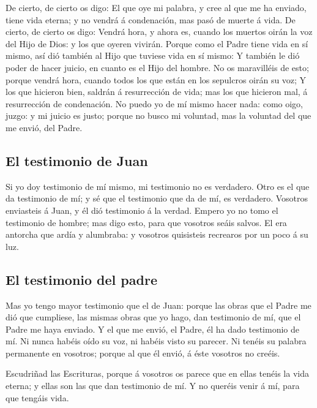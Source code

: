 De cierto, de cierto os digo: El que oye mi palabra, y
cree al que me ha enviado, tiene vida eterna; y no vendrá á condenación,
mas pasó de muerte á vida.  De cierto, de cierto os digo:
Vendrá hora, y ahora es, cuando los muertos oirán la voz del Hijo de
Dios: y los que oyeren vivirán.  Porque como el Padre
tiene vida en sí mismo, así dió también al Hijo que tuviese vida en sí
mismo:  Y también le dió poder de hacer juicio, en cuanto
es el Hijo del hombre.  No os maravilléis de esto; porque
vendrá hora, cuando todos los que están en los sepulcros oirán su voz;
 Y los que hicieron bien, saldrán á resurrección de vida;
mas los que hicieron mal, á resurrección de condenación. 
No puedo yo de mí mismo hacer nada: como oigo, juzgo: y mi juicio es
justo; porque no busco mi voluntad, mas la voluntad del que me envió,
del Padre.

\hypertarget{el-testimonio-de-juan}{%
\subsection{El testimonio de Juan}\label{el-testimonio-de-juan}}

 Si yo doy testimonio de mí mismo, mi testimonio no es
verdadero.  Otro es el que da testimonio de mí; y sé que
el testimonio que da de mí, es verdadero.  Vosotros
enviasteis á Juan, y él dió testimonio á la verdad. 
Empero yo no tomo el testimonio de hombre; mas digo esto, para que
vosotros seáis salvos.  El era antorcha que ardía y
alumbraba: y vosotros quisisteis recrearos por un poco á su luz.

\hypertarget{el-testimonio-del-padre}{%
\subsection{El testimonio del padre}\label{el-testimonio-del-padre}}

 Mas yo tengo mayor testimonio que el de Juan: porque las
obras que el Padre me dió que cumpliese, las mismas obras que yo hago,
dan testimonio de mí, que el Padre me haya enviado.  Y el
que me envió, el Padre, él ha dado testimonio de mí. Ni nunca habéis
oído su voz, ni habéis visto su parecer.  Ni tenéis su
palabra permanente en vosotros; porque al que él envió, á éste vosotros
no creéis.

 Escudriñad las Escrituras, porque á vosotros os parece
que en ellas tenéis la vida eterna; y ellas son las que dan testimonio
de mí.  Y no queréis venir á mí, para que tengáis vida.

